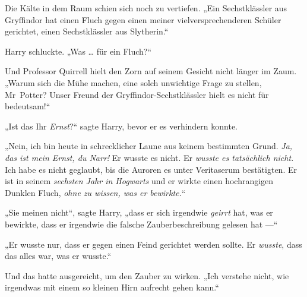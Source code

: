 Die Kälte in dem Raum schien sich noch zu vertiefen.
„Ein Sechstklässler aus Gryffindor hat einen Fluch gegen einen meiner vielversprechenderen Schüler gerichtet, einen Sechstklässler aus Slytherin.“

Harry schluckte.
„Was … für ein Fluch?“

Und Professor Quirrell hielt den Zorn auf seinem Gesicht nicht länger im Zaum.
„Warum sich die Mühe machen, eine solch unwichtige Frage zu stellen, Mr~Potter? Unser Freund der Gryffindor-Sechstklässler hielt es nicht für bedeutsam!“

„Ist das Ihr \emph{Ernst}?“ sagte Harry, bevor er es verhindern konnte.

„Nein, ich bin heute in schrecklicher Laune aus keinem bestimmten Grund. \emph{Ja, das ist mein Ernst, du Narr!} Er wusste es nicht. Er \emph{wusste es tatsächlich nicht.} Ich habe es nicht geglaubt, bis die Auroren es unter Veritaserum bestätigten. Er ist in seinem \emph{sechsten Jahr in Hogwarts} und er wirkte einen hochrangigen Dunklen Fluch, \emph{ohne zu wissen, was er bewirkte.}“

„Sie meinen nicht“, sagte Harry, „dass er sich irgendwie \emph{geirrt} hat, was er bewirkte, dass er irgendwie die falsche Zauberbeschreibung gelesen hat —“

„Er wusste nur, dass er gegen einen Feind gerichtet werden sollte. Er \emph{wusste}, dass das alles war, was er wusste.“

Und das hatte ausgereicht, um den Zauber zu wirken.
„Ich verstehe nicht, wie irgendwas mit einem so kleinen Hirn aufrecht gehen kann.“

